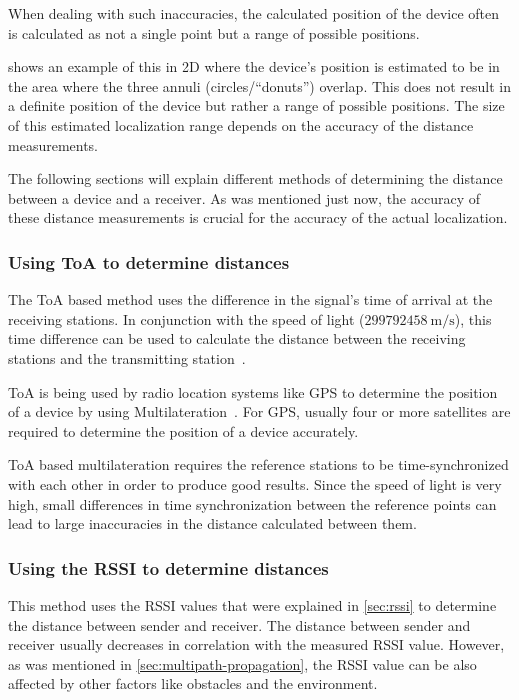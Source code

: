 When dealing with such inaccuracies, the calculated position of the device often is calculated as not a single point but a range of possible positions.

 shows an example of this in 2D where the device's position is estimated to be in the area where the three annuli (circles/``donuts'') overlap.
This does not result in a definite position of the device but rather a range of possible positions.
The size of this estimated localization range depends on the accuracy of the distance measurements.

The following sections will explain different methods of determining the distance between a device and a receiver.
As was mentioned just now, the accuracy of these distance measurements is crucial for the accuracy of the actual localization.

\subsubsection{Using \acl{ToA} to determine distances}\label{sec:toa-based-multilateration}

The \acf{ToA} based method uses the difference in the signal's time of arrival at the receiving stations.
In conjunction with the speed of light ($299792458\ \mathrm{m/s}$), this time difference can be used to calculate the distance between the receiving stations and the transmitting station~\cite{khalaf-allah_time_2015}.

\ac{ToA} is being used by radio location systems like \ac{GPS} to determine the position of a device by using Multilateration~\cite{department_of_defense_usa_gps_2020}.
For GPS, usually four or more satellites are required to determine the position of a device accurately.

\ac{ToA} based multilateration requires the reference stations to be time-synchronized with each other in order to produce good results.
Since the speed of light is very high, small differences in time synchronization between the reference points can lead to large inaccuracies in the distance calculated between them.

\subsubsection{Using the \acl{RSSI} to determine distances}\label{sec:rssi-based-multilateration}

This method uses the \acf{RSSI} values that were explained in \cref{sec:rssi} to determine the distance between sender and receiver.
The distance between sender and receiver usually decreases in correlation with the measured \ac{RSSI} value.
However, as was mentioned in \cref{sec:multipath-propagation}, the \ac{RSSI} value can be also affected by other factors like obstacles and the environment.

